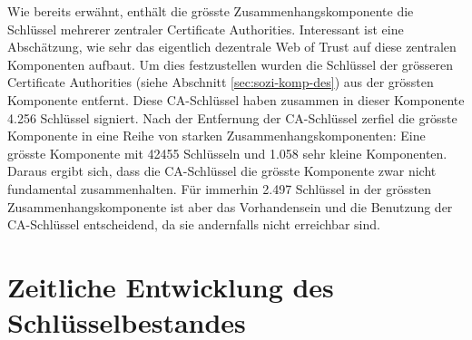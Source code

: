 Wie bereits erw\"ahnt, enth\"alt die gr\"osste Zusammenhangskomponente
die Schl\"ussel mehrerer zentraler Certificate
Authorities. Interessant ist eine Absch\"atzung, wie sehr das
eigentlich dezentrale Web of Trust auf diese zentralen Komponenten
aufbaut. Um dies festzustellen wurden die Schl\"ussel der gr\"osseren
Certificate Authorities (siehe Abschnitt \ref{sec:sozi-komp-des}) aus
der gr\"ossten Komponente entfernt. Diese CA-Schl\"ussel haben
zusammen in dieser Komponente 4.256 Schl\"ussel signiert. Nach der
Entfernung der CA-Schl\"ussel zerfiel die gr\"osste Komponente in eine
Reihe von starken Zusammenhangskomponenten: Eine gr\"osste Komponente
mit 42455 Schl\"usseln und 1.058 sehr kleine Komponenten. Daraus ergibt
sich, dass die CA-Schl\"ussel die gr\"osste Komponente zwar nicht
fundamental zusammenhalten. F\"ur immerhin 2.497 Schl\"ussel in der
gr\"ossten Zusammenhangskomponente ist aber das Vorhandensein und die
Benutzung der CA-Schl\"ussel entscheidend, da sie andernfalls nicht
erreichbar sind.

\section{Zeitliche Entwicklung des Schl\"usselbestandes}
\label{sec:result-key-properties}

